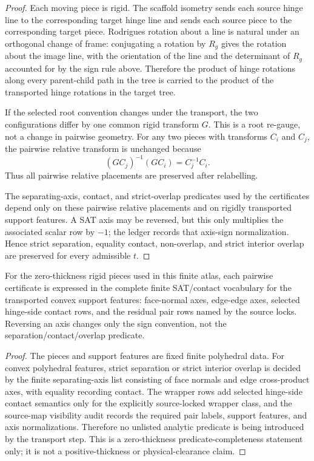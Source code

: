 \begin{proof}
Each moving piece is rigid.  The scaffold isometry sends each source hinge line to the corresponding target hinge line and sends each source piece to the corresponding target piece.  Rodrigues rotation about a line is natural under an orthogonal change of frame: conjugating a rotation by \(R_g\) gives the rotation about the image line, with the orientation of the line and the determinant of \(R_g\) accounted for by the sign rule above.  Therefore the product of hinge rotations along every parent-child path in the tree is carried to the product of the transported hinge rotations in the target tree.

If the selected root convention changes under the transport, the two configurations differ by one common rigid transform \(G\).  This is a root re-gauge, not a change in pairwise geometry.  For any two pieces with transforms \(C_i\) and \(C_j\), the pairwise relative transform is unchanged because
\[
  (G C_j)^{-1}(G C_i) = C_j^{-1} C_i .
\]
Thus all pairwise relative placements are preserved after relabelling.

The separating-axis, contact, and strict-overlap predicates used by the certificates depend only on these pairwise relative placements and on rigidly transported support features.  A SAT axis may be reversed, but this only multiplies the associated scalar row by \(-1\); the ledger records that axis-sign normalization.  Hence strict separation, equality contact, non-overlap, and strict interior overlap are preserved for every admissible \(t\).
\end{proof}

\begin{lemma}
For the zero-thickness rigid pieces used in this finite atlas, each pairwise certificate is expressed in the complete finite SAT/contact vocabulary for the transported convex support features: face-normal axes, edge-edge axes, selected hinge-side contact rows, and the residual pair rows named by the source locks.  Reversing an axis changes only the sign convention, not the separation/contact/overlap predicate.
\end{lemma}

\begin{proof}
The pieces and support features are fixed finite polyhedral data.  For convex polyhedral features, strict separation or strict interior overlap is decided by the finite separating-axis list consisting of face normals and edge cross-product axes, with equality recording contact.  The wrapper rows add selected hinge-side contact semantics only for the explicitly source-locked wrapper class, and the source-map visibility audit records the required pair labels, support features, and axis normalizations.  Therefore no unlisted analytic predicate is being introduced by the transport step.  This is a zero-thickness predicate-completeness statement only; it is not a positive-thickness or physical-clearance claim.
\end{proof}

